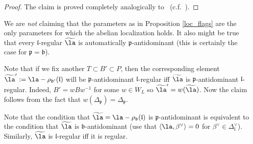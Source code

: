 \documentclass[12pt]{amsart}
\begin{document}
\begin{proof}
	The claim is proved completely analogically to~\cite[Th\'eor$\grave{\on{e}}$me principal]{bb} (c.f.~\cite[Theorem 5.1]{bak}). 
\end{proof}


\begin{warning}
We are {\emph{not}} claiming that the parameters as in Proposition \ref{loc_flags} are the only parameters for which the abelian localization holds. 
It also might be true that every $\mathfrak{l}$-regular $\widetilde{\la}$ is automatically $\mathfrak{p}$-antidominant (this is certainly the case for $\mathfrak{p}=\mathfrak{b}$).
\end{warning}




\begin{rmk}
Note that if we fix another $T \subset B' \subset P$, then the corresponding element $\widetilde{\la}' := \la -\rho_{\mathfrak{b}'}(\mathfrak{l})$ will be $\mathfrak{p}$-antidominant $\mathfrak{l}$-regular iff $\widetilde{\la}$ is $\mathfrak{p}$-antidominant $\mathfrak{l}$-regular. Indeed, $B'=wBw^{-1}$ for some $w \in W_L$ so $\widetilde{\la}'=w(\widetilde{\la})$. Now the claim follows from the fact that $w(\Delta_{\mathfrak{p}})=\Delta_{\mathfrak{p}}$.
\end{rmk}

	
\begin{rmk}
Note that the condition that $\widetilde{\la}=\la-\rho_{\mathfrak{b}}(\mathfrak{l})$ is $\mathfrak{p}$-antidominant is equivalent to the condition that  $\widetilde{\la}$ is $\mathfrak{b}$-antidominant (use that $\langle \la,\beta^\vee\rangle = 0$ for $\beta^\vee \in \Delta_{\mathfrak{l}}^\vee$). Similarly, $\widetilde{\la}$ is $\mathfrak{l}$-regular iff it is regular.   
\end{rmk}
	
\end{document}
